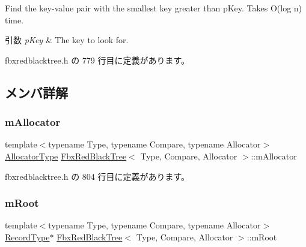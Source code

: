 Find the key-\/value pair with the smallest key greater than p\+Key. Takes O(log n) time. 
\begin{DoxyParams}{引数}
{\em p\+Key} & The key to look for. \\
\hline
\end{DoxyParams}


 fbxredblacktree.\+h の 779 行目に定義があります。



\subsection{メンバ詳解}
\mbox{\label{class_fbx_red_black_tree_aefc2938bd74cea7e072d344d5b038af1}} 
\subsubsection{\texorpdfstring{m\+Allocator}{mAllocator}}
{\footnotesize\ttfamily template$<$typename Type, typename Compare, typename Allocator$>$ \\
\hyperlink{class_fbx_red_black_tree_a62c49ab2e7d602aac98a9413e490ca90}{Allocator\+Type} \hyperlink{class_fbx_red_black_tree}{Fbx\+Red\+Black\+Tree}$<$ Type, Compare, Allocator $>$\+::m\+Allocator\hspace{0.3cm}{\ttfamily [protected]}}



 fbxredblacktree.\+h の 804 行目に定義があります。

\mbox{\label{class_fbx_red_black_tree_a1c8e942b25077e380f93a61aaadd8679}} 
\subsubsection{\texorpdfstring{m\+Root}{mRoot}}
{\footnotesize\ttfamily template$<$typename Type, typename Compare, typename Allocator$>$ \\
\hyperlink{class_fbx_red_black_tree_1_1_record_type}{Record\+Type}$\ast$ \hyperlink{class_fbx_red_black_tree}{Fbx\+Red\+Black\+Tree}$<$ Type, Compare, Allocator $>$\+::m\+Root\hspace{0.3cm}{\ttfamily [protected]}}



